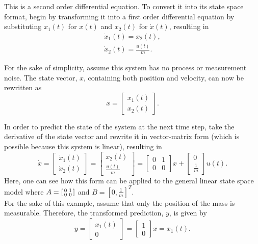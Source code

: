 \noindent This is a second order differential equation. To convert it into its state space format, begin by transforming it into a first order differential equation by substituting $x_1(t)$ for $x(t)$ and $x_2(t)$ for $\dot{x}(t)$, resulting in
\begin{align*}
\dot{x}_1(t) = x_2(t), \\
\dot{x}_2(t) = \frac{u(t)}{m}.
\end{align*}

\noindent For the sake of simplicity, assume this system has no process or measurement noise. The state vector, $x$, containing both position and velocity, can now be rewritten as
$$
x=
\begin{bmatrix}
x_1(t)\\
x_2(t)
\end{bmatrix}.
$$

\noindent In order to predict the state of the system at the next time step, take the derivative of the state vector and rewrite it in vector-matrix form (which is possible because this system is linear), resulting in
$$
\dot x=
\begin{bmatrix}
\dot{x}_1(t)\\
\dot{x}_2(t)
\end{bmatrix}=
\begin{bmatrix}
x_2(t)\\
\frac{u(t)}{m}
\end{bmatrix}=
\begin{bmatrix}
0 & 1\\
0 & 0
\end{bmatrix} x +
\begin{bmatrix}
0\\
\frac{1}{m}
\end{bmatrix} u(t).
$$
Here, one can see how this form can be applied to the general linear state space model where $A = 
\begin{bsmallmatrix}
0 & 1\\
0 & 0
\end{bsmallmatrix} $ and $ B=[0, \frac{1}{m}]^T$. \\

\noindent For the sake of this example, assume that only the position of the mass is measurable. Therefore, the transformed prediction, $y$, is given by
$$
 y=
\begin{bmatrix}
x_1(t)\\
0
\end{bmatrix}=
\begin{bmatrix}
1 \\
0
\end{bmatrix} x=
x_1(t). $$

